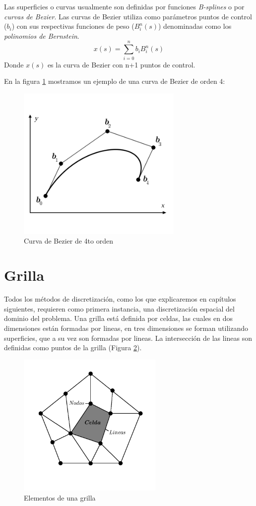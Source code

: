 \documentclass[a4paper,10pt, oneside]{book}
\begin{document}
Las superficies o curvas usualmente son definidas por funciones \textit{B-splines} o por \textit{curvas de Bezier}. Las curvas de Bezier utiliza como parámetros puntos de control (\textbf{$b_i$}) con sus respectivas funciones de peso (\textbf{$B^n_i(s)$}) denominadas como los  \textit{polinomios de Bernstein}.
\begin{equation}
	x(s) = \sum^n_{i=0} b_i B^n_i(s)
\end{equation}
Donde $x(s)$ es la curva de Bezier con n+1 puntos de control. 

En la figura \ref{img:3-3} mostramos un ejemplo de una curva de Bezier de orden 4:
\begin{figure}[h!]
	\centering
	\includegraphics[width=8cm]{Img/3-3}
	\caption{Curva de Bezier de 4to orden}
	\label{img:3-3}
\end{figure}

\pagebreak

\section{Grilla}

Todos los métodos de discretización, como los que explicaremos en capítulos siguientes, requieren como primera instancia, una discretización espacial del dominio del problema. Una grilla está definida por celdas, las cuales en dos dimensiones están formadas por lineas, en tres dimensiones se forman utilizando superficies, que a su vez son formadas por lineas. La intersección de las lineas son definidas como puntos de la grilla (Figura \ref{img:3-4}).
\begin{figure}[h!]
	\centering
	\includegraphics[width=7cm]{Img/3-5}
	\caption{Elementos de una grilla}
	\label{img:3-4}
\end{figure}
\end{document}
